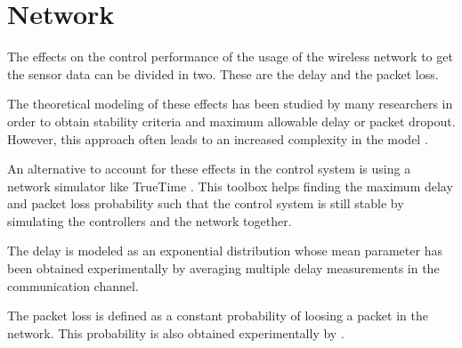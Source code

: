 \section{Network}
The effects on the control performance of the usage of the wireless network to get the sensor data can be divided in two. These are the delay and the packet loss.

The theoretical modeling of these effects has been studied by many researchers in order to obtain stability criteria and maximum allowable delay or packet dropout. However, this approach often leads to an increased complexity in the model .

An alternative to account for these effects in the control system is using a network simulator like TrueTime  \cite{TrueTimeNew}. This toolbox helps finding the maximum delay and packet loss probability such that the control system is still stable by simulating the controllers and the network together.

The delay is modeled as an exponential distribution whose mean parameter has been obtained experimentally by averaging multiple delay measurements in the communication channel. 

The packet loss is defined as a constant probability of loosing a packet in the network. This probability is also obtained experimentally by .
